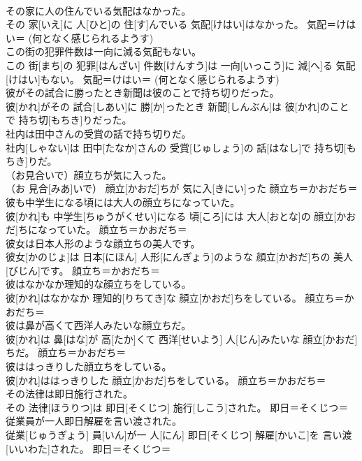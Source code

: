\documentclass[8pt]{extreport}
\begin{document}
\begin{CJK}{UTF8}{min}
{\\	その家に人の住んでいる気配はなかった。	
\\	その 家[いえ]に 人[ひと]の 住[す]んでいる 気配[けはい]はなかった。	気配＝けはい＝ (何となく感じられるようす) 
\\	この街の犯罪件数は一向に減る気配もない。	
\\	この 街[まち]の 犯罪[はんざい] 件数[けんすう]は 一向[いっこう]に 減[へ]る 気配[けはい]もない。	気配＝けはい＝ (何となく感じられるようす) 
\\	彼がその試合に勝ったとき新聞は彼のことで持ち切りだった。	
\\	彼[かれ]がその 試合[しあい]に 勝[か]ったとき 新聞[しんぶん]は 彼[かれ]のことで 持ち切[もちき]りだった。	
\\	社内は田中さんの受賞の話で持ち切りだ。	
\\	社内[しゃない]は 田中[たなか]さんの 受賞[じゅしょう]の 話[はなし]で 持ち切[もちき]りだ。	
\\	（お見合いで）顔立ちが気に入った。	
\\	（お 見合[みあ]いで） 顔立[かおだ]ちが 気に入[きにい]った	顔立ち＝かおだち＝ 
\\	彼も中学生になる頃には大人の顔立ちになっていた。	
\\	彼[かれ]も 中学生[ちゅうがくせい]になる 頃[ころ]には 大人[おとな]の 顔立[かおだ]ちになっていた。	顔立ち＝かおだち＝ 
\\	彼女は日本人形のような顔立ちの美人です。	
\\	彼女[かのじょ]は 日本[にほん] 人形[にんぎょう]のような 顔立[かおだ]ちの 美人[びじん]です。	顔立ち＝かおだち＝ 
\\	彼はなかなか理知的な顔立ちをしている。	
\\	彼[かれ]はなかなか 理知的[りちてき]な 顔立[かおだ]ちをしている。	顔立ち＝かおだち＝ 
\\	彼は鼻が高くて西洋人みたいな顔立ちだ。	
\\	彼[かれ]は 鼻[はな]が 高[たか]くて 西洋[せいよう] 人[じん]みたいな 顔立[かおだ]ちだ。	顔立ち＝かおだち＝ 
\\	彼ははっきりした顔立ちをしている。	
\\	彼[かれ]ははっきりした 顔立[かおだ]ちをしている。	顔立ち＝かおだち＝ 
\\	その法律は即日施行された。	
\\	その 法律[ほうりつ]は 即日[そくじつ] 施行[しこう]された。	即日＝そくじつ＝ 
\\	従業員が一人即日解雇を言い渡された。	
\\	従業[じゅうぎょう] 員[いん]が一 人[にん] 即日[そくじつ] 解雇[かいこ]を 言い渡[いいわた]された。	即日＝そくじつ＝ 
}
\end{CJK}
\end{document}
